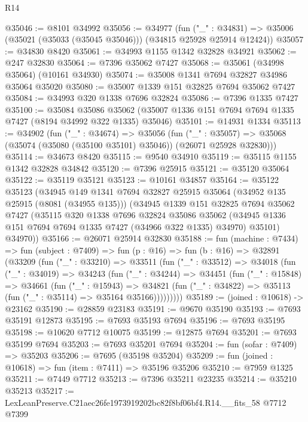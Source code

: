 \begin{lexlean}{R14}
\begin{coremodule}
@35046 := @8101 @34992
@35056 := @34977
    (fun ("_" : @34831) => @35006 (@35021 (@35033 (@35045 @35046))) (@34815 @25928 @25914 @12424))
@35057 := @34830 @8420
@35061 := @34993 @1155 @1342 @32828 @34921
@35062 := @247 @32830
@35064 := @7396 @35062 @7427
@35068 := @35061 (@34998 @35064) (@10161 @34930)
@35074 := @35008 @1341 @7694 @32827 @34986 @35064 @35020
@35080 := @35007 @1339 @151 @32825 @7694 @35062 @7427
@35084 := @34993 @320 @1338 @7696 @32824
@35086 := @7396 @1335 @7427
@35100 := @35084
    @35086
    @35062
    (@35007 @1336 @151 @7694 @7694 @1335 @7427 (@8194 @34992 @322 @1335) @35046)
@35101 := @14931 @1334
@35113 := @34902
    (fun ("_" : @34674) =>
    @35056
      (fun ("_" : @35057) =>
      @35068 (@35074 (@35080 (@35100 @35101) @35046)) (@26071 @25928 @32830)))
@35114 := @34673 @8420
@35115 := @9540 @34910
@35119 := @35115 @1155 @1342 @32828 @34842
@35120 := @7396 @25915
@35121 := @35120 @35064
@35122 := @35119 @35121
@35123 := @10161 @34857
@35164 := @35122
    @35123
    (@34945
      @149
      @1341
      @7694
      @32827
      @25915
      @35064
      (@34952 @135 @25915 (@8081 (@34955 @135)))
      (@34945
        @1339
        @151
        @32825
        @7694
        @35062
        @7427
        (@35115
          @320
          @1338
          @7696
          @32824
          @35086
          @35062
          (@34945 @1336 @151 @7694 @7694 @1335 @7427 (@34966 @322 @1335) @34970)
          @35101)
        @34970))
@35166 := @26071 @25914 @32830
@35188 := fun (machine : @7434) =>
  fun (subject : @7409) =>
  fun (p : @16) =>
  fun (b : @16) =>
  @32891
    (@33209
      (fun ("_" : @33210) =>
      @33511
        (fun ("_" : @33512) =>
        @34018
          (fun ("_" : @34019) =>
          @34243
            (fun ("_" : @34244) =>
            @34451
              (fun ("_" : @15848) =>
              @34661
                (fun ("_" : @15943) =>
                @34821 (fun ("_" : @34822) => @35113 (fun ("_" : @35114) => @35164 @35166)))))))))
@35189 := (joined : @10618) -> @23162
@35190 := @28859 @23183
@35191 := @9670 @35190
@35193 := @7693 @35191 @12873
@35195 := @7693 @35193 @7694
@35196 := @7693 @35195
@35198 := @10620 @7712 @10075
@35199 := @12875 @7694
@35201 := @7693 @35199 @7694
@35203 := @7693 @35201 @7694
@35204 := fun (sofar : @7409) => @35203
@35206 := @7695 (@35198 @35204)
@35209 := fun (joined : @10618) => fun (item : @7411) => @35196 @35206
@35210 := @7959 @1325
@35211 := @7449 @7712
@35213 := @7396 @35211 @23235
@35214 := @35210 @35213
@35217 := LexLeanPreserve.C21aec26fe1973919202bc82f8bf06bf4.R14.__fits_58 @7712 @7399

\end{coremodule}
\end{lexlean}
